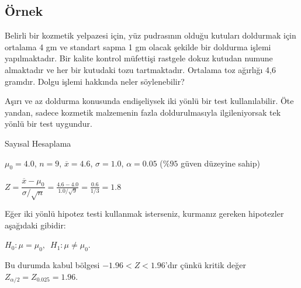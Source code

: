 \documentclass[
  12pt,
]{book}
\begin{document}
\hypertarget{uxf6rnek}{%
\subsection{Örnek}\label{uxf6rnek}}

Belirli bir kozmetik yelpazesi için, yüz pudrasının olduğu kutuları doldurmak için ortalama 4 gm ve standart sapma 1 gm olacak şekilde bir doldurma işlemi yapılmaktadır. Bir kalite kontrol müfettişi rastgele dokuz kutudan numune almaktadır ve her bir kutudaki tozu tartmaktadır. Ortalama toz ağırlığı 4,6 gramdır. Dolgu işlemi hakkında neler söylenebilir?

Aşırı ve az doldurma konusunda endişeliysek iki yönlü bir test kullanılabilir. Öte yandan, sadece kozmetik malzemenin fazla doldurulmasıyla ilgileniyorsak tek yönlü bir test uygundur.

Sayısal Hesaplama

\(\mu_{0} = 4.0\), \(n=9\), \(\overline{x} = 4.6\), \(\sigma = 1.0\), \(\alpha = 0.05\) (\(\%95\) güven düzeyine sahip)

\(Z = \dfrac{\overline{x} - \mu_{0}}{\sigma / \sqrt{n}} = \frac{4.6 - 4.0}{1.0 / \sqrt{9}} = \frac{0.6}{1/3} = 1.8\)

Eğer iki yönlü hipotez testi kullanmak isterseniz, kurmanız gereken hipotezler aşağıdaki gibidir:

\(H_{0}: \mu = \mu_{0},\,\,\, H_{1}: \mu \neq \mu_{0}\).

Bu durumda kabul bölgesi \(−1.96 < Z < 1.96\)'dır çünkü kritik değer \(Z_{\alpha/2} = Z_{0.025} = 1.96\).
\end{document}
